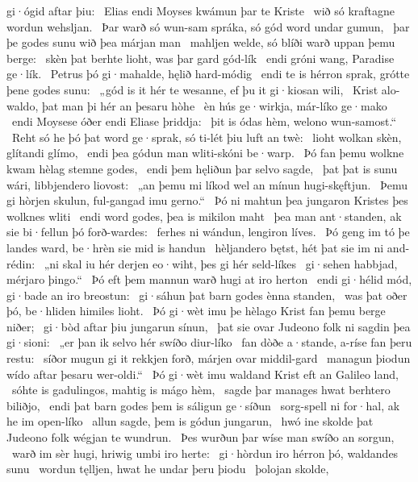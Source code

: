 gi·ógid aftar þiu: \hld\ Elias endi Moyses
kwámun þar te Kriste \hld\ wið só kraftagne
wordun wehsljan. \hld\ Þar warð só wun-sam spráka,
só gód word undar gumun, \hld\ þar þe godes sunu
wið þea márjan man \hld\ mahljen welde,
só blíði warð uppan þemu berge: \hld\ skèn þat berhte lioht,
was þar gard gód-lík \hld\ endi gróni wang,
Paradise ge·lík. \hld\ Petrus þó gi·mahalde,
hęlið hard-módig \hld\ endi te is hérron sprak,
grótte þene godes sunu: \hld\ „gód is it hér te wesanne,
ef þu it gi·kiosan wili, \hld\ Krist alo-waldo,
þat man þi hér an þesaru hòhe \hld\ èn hús ge·wirkja,
már-líko ge·mako \hld\ endi Moysese óðer
endi Eliase þriddja: \hld\ þit is ódas hèm,
welono wun-samost.“ \hld\ Reht só he þó þat word ge·sprak,
só ti-lét þiu luft an twè: \hld\ lioht wolkan skèn,
glítandi glímo, \hld\ endi þea gódun man
wliti-skóni be·warp. \hld\ Þó fan þemu wolkne kwam
hèlag stemne godes, \hld\ endi þem hęliðun þar
selvo sagde, \hld\ þat þat is sunu wári,
libbjendero liovost: \hld\ „an þemu mi líkod wel
an mínun hugi-skęftjun. \hld\ Þemu gi hòrjen skulun,
ful-gangad imu gerno.“ \hld\ Þó ni mahtun þea jungaron Kristes
þes wolknes wliti \hld\ endi word godes,
þea is mikilon maht \hld\ þea man ant·standen,
ak sie bi·fellun þó forð-wardes: \hld\ ferhes ni wándun,
lengiron líves. \hld\ Þó geng im tó þe landes ward,
be·hrèn sie mid is handun \hld\ hèljandero bętst,
hét þat sie im ni and-rédin: \hld\ „ni skal iu hér derjen eo·wiht,
þes gi hér seld-líkes \hld\ gi·sehen habbjad,
mérjaro þingo.“ \hld\ Þó eft þem mannun warð
hugi at iro herton \hld\ endi gi·hélid mód,
gi·bade an iro breostun: \hld\ gi·sáhun þat barn godes
ènna standen, \hld\ was þat oðer þó,
be·hliden himiles lioht. \hld\ Þó gi·wèt imu þe hèlago Krist
fan þemu berge niðer; \hld\ gi·bòd aftar þiu
jungarun sínun, \hld\ þat sie ovar Judeono folk
ni sagdin þea gi·sioni: \hld\ „er þan ik selvo hér
swíðo diur-líko \hld\ fan dòðe a·stande,
a-ríse fan þeru restu: \hld\ síðor mugun gi it rekkjen forð,
márjen ovar middil-gard \hld\ managun þiodun
wído aftar þesaru wer-oldi.“ \hld\ Þó gi·wèt imu waldand Krist
eft an Galileo land, \hld\ sóhte is gadulingos,
mahtig is mágo hèm, \hld\ sagde þar manages hwat
berhtero biliðjo, \hld\ endi þat barn godes
þem is sáligun ge·síðun \hld\ sorg-spell ni for·hal,
ak he im open-líko \hld\ allun sagde,
þem is gódun jungarun, \hld\ hwó ine skolde þat Judeono folk
wégjan te wundrun. \hld\ Þes wurðun þar wíse man
swíðo an sorgun, \hld\ warð im sèr hugi,
hriwig umbi iro herte: \hld\ gi·hòrdun iro hérron þó,
waldandes sunu \hld\ wordun tęlljen,
hwat he undar þeru þiodu \hld\ þolojan skolde,
